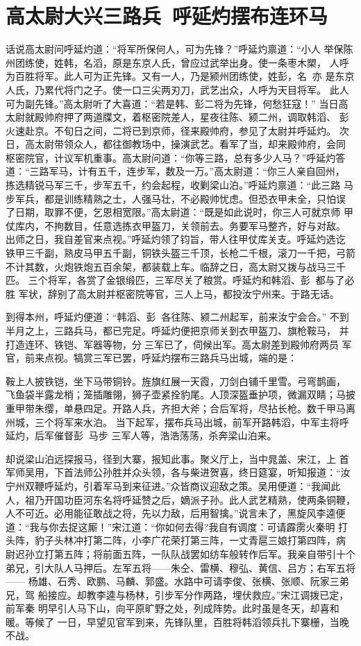 \chapter{高太尉大兴三路兵~呼延灼摆布连环马}

话说高太尉问呼延灼道：“将军所保何人，可为先锋？”呼延灼禀道：“小人
举保陈州团练使，姓韩，名滔，原是东京人氏，曾应过武举出身。使一条枣木槊，
人呼为百胜将军。此人可为正先锋。又有一人，乃是颍州团练使，姓彭，名，亦
是东京人氏，乃累代将门之子。使一口三尖两刃刀，武艺出众，人呼为天目将军。
此人可为副先锋。”高太尉听了大喜道：“若是韩、彭二将为先锋，何愁狂寇！”
当日高太尉就殿帅府押了两道牒文，着枢密院差人，星夜往陈、颍二州，调取韩滔、
彭，火速赴京。不旬日之间，二将已到京师，径来殿帅府，参见了太尉并呼延灼。
次日，高太尉带领众人，都往御教场中，操演武艺。看军了当，却来殿帅府，会同
枢密院官，计议军机重事。高太尉问道：“你等三路，总有多少人马？”呼延灼答
道：“三路军马，计有五千，连步军，数及一万。”高太尉道：“你三人亲自回州，
拣选精锐马军三千，步军五千，约会起程，收剿梁山泊。”呼延灼禀道：“此三路
马步军兵，都是训练精熟之士，人强马壮，不必殿帅忧虑。但恐衣甲未全，只怕误
了日期，取罪不便，乞恩相宽限。”高太尉道：“既是如此说时，你三人可就京师
甲仗库内，不拘数目，任意选拣衣甲盔刀，关领前去。务要军马整齐，好与对敌。
出师之日，我自差官来点视。”呼延灼领了钧旨，带人往甲仗库关支。呼延灼选讫
铁甲三千副，熟皮马甲五千副，铜铁头盔三千顶，长枪二千根，滚刀一千把，弓箭
不计其数，火炮铁炮五百余架，都装载上车。临辞之日，高太尉又拨与战马三千匹。
三个将军，各赏了金银缎匹，三军尽关了粮赏。呼延灼和韩滔、彭，都与了必胜
军状，辞别了高太尉并枢密院等官，三人上马，都投汝宁州来。于路无话。

到得本州，呼延灼便道：“韩滔、彭，各往陈、颍二州起军，前来汝宁会合。”
不到半月之上，三路兵马，都已完足。呼延灼便把京师关到衣甲盔刀、旗枪鞍马，
并打造连环、铁铠、军器等物，分三军已了，伺候出军。高太尉差到殿帅府两员
军官，前来点视。犒赏三军已罢，呼延灼摆布三路兵马出城，端的是：

鞍上人披铁铠，坐下马带铜铃。旌旗红展一天霞，刀剑白铺千里雪。弓弯鹊画，
飞鱼袋半露龙梢；笼插雕翎，狮子壶紧拴豹尾。人顶深盔垂护项，微漏双睛；马披
重甲带朱缨，单悬四足。开路人兵，齐担大斧；合后军将，尽拈长枪。数千甲马离
州城，三个将军来水泊。
当下起军，摆布兵马出城，前军开路韩滔，中军主将呼延灼，后军催督彭，马步
三军人等，浩浩荡荡，杀奔梁山泊来。

却说梁山泊远探报马，径到大寨，报知此事。聚义厅上，当中晁盖、宋江，上
首军师吴用，下首法师公孙胜并众头领，各与柴进贺喜，终日筵宴，听知报道：“汝
宁州双鞭呼延灼，引着军马到来征进。”众皆商议迎敌之策。吴用便道：“我闻此
人，祖乃开国功臣河东名将呼延赞之后，嫡派子孙。此人武艺精熟，使两条铜鞭，
人不可近。必用能征敢战之将，先以力敌，后用智擒。”说言未了，黑旋风李逵便
道：“我与你去捉这厮！”宋江道：“你如何去得?我自有调度：可请霹雳火秦明
打头阵，豹子头林冲打第二阵，小李广花荣打第三阵，一丈青扈三娘打第四阵，病
尉迟孙立打第五阵；将前面五阵，一队队战罢如纺车般转作后军。我亲自带引十个
弟兄，引大队人马押后。左军五将——朱仝、雷横、穆弘、黄信、吕方；右军五将——
杨雄、石秀、欧鹏、马麟、郭盛。水路中可请李俊、张横、张顺、阮家三弟兄，驾
船接应。却教李逵与杨林，引步军分作两路，埋伏救应。”宋江调拨已定，前军秦
明早引人马下山，向平原旷野之处，列成阵势。此时虽是冬天，却喜和暖。等候了
一日，早望见官军到来，先锋队里，百胜将韩滔领兵扎下寨栅，当晚不战。

